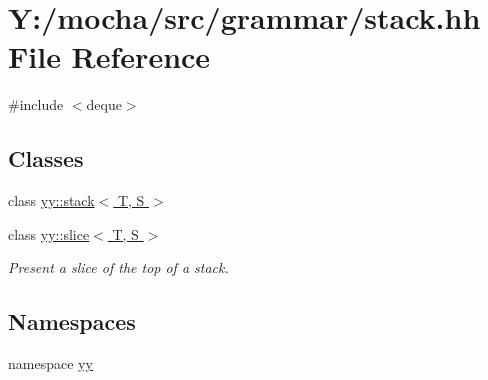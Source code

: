 \hypertarget{stack_8hh}{
\section{Y:/mocha/src/grammar/stack.hh File Reference}
\label{stack_8hh}
}
{\ttfamily \#include $<$deque$>$}\par
\subsection*{Classes}
\begin{DoxyCompactItemize}
\item 
class \hyperlink{classyy_1_1stack}{yy::stack$<$ T, S $>$}
\item 
class \hyperlink{classyy_1_1slice}{yy::slice$<$ T, S $>$}
\begin{DoxyCompactList}\small\item\em Present a slice of the top of a stack. \end{DoxyCompactList}\end{DoxyCompactItemize}
\subsection*{Namespaces}
\begin{DoxyCompactItemize}
\item 
namespace \hyperlink{namespaceyy}{yy}
\end{DoxyCompactItemize}
